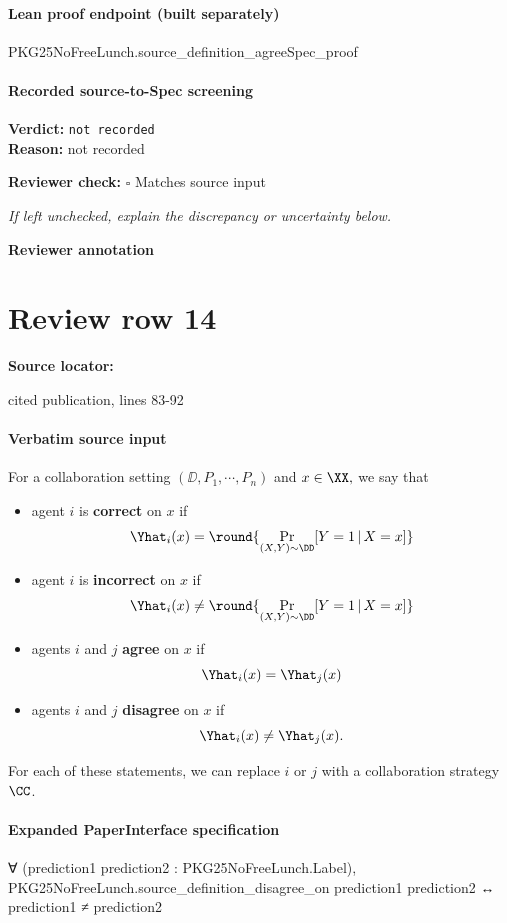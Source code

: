 \documentclass[10pt]{article}
\newcommand{\reviewerbox}{%
  \par\noindent\fbox{\parbox{0.96\linewidth}{\rule{0pt}{0.38in}}}\par
}
\newcommand{\reviewmatch}[1]{%
  \par\noindent\textbf{Reviewer check:} $\square$\; #1\par
  \noindent\emph{If left unchecked, explain the discrepancy or uncertainty below.}\par
}
\begin{document}
\paragraph{Lean proof endpoint (built separately)}\begin{ReviewVerbatim}
PKG25NoFreeLunch.source_definition_agreeSpec_proof
\end{ReviewVerbatim}

\paragraph{Recorded source-to-Spec screening}
\textbf{Verdict:} \texttt{not recorded}
\\
\textbf{Reason:} not recorded
\reviewmatch{Matches source input}
\noindent\textbf{Reviewer annotation}\par
\reviewerbox
\clearpage
\hypertarget{source-claim-b15831d5b4ce3fd5}{}
\section*{Review row 14}
\textbf{Source locator:} {\footnotesize\raggedright cited publication, lines 83-\allowbreak{}92\par}
\paragraph{Verbatim source input}
\begin{ReviewVerbatim}
\begin{definition}\label{def:correct}
For a collaboration setting $(\DD, P_1,\cdots,P_n)$ and $x\in \XX,$ we say that
\begin{itemize}
    \item agent $i$ is \textbf{correct} on $x$ if $$\Yhat_i(x) = \round{\Pr_{(X,Y)\sim \DD}[Y=1\,|\,X=x]}$$
    \item agent $i$ is \textbf{incorrect} on $x$ if $$\Yhat_i(x) \neq \round{\Pr_{(X,Y)\sim \DD}[Y=1\,|\,X=x]}$$
    \item agents $i$ and $j$ \textbf{agree} on $x$ if $$\Yhat_i(x) = \Yhat_j(x)$$
    \item agents $i$ and $j$ \textbf{disagree} on $x$ if $$\Yhat_i(x) \neq \Yhat_j(x).$$
\end{itemize}
For each of these statements, we can replace $i$ or $j$ with a collaboration strategy $\CC$.
\end{definition}
\end{ReviewVerbatim}


\paragraph{Expanded PaperInterface specification}
\begin{ReviewVerbatim}
∀ (prediction1 prediction2 : PKG25NoFreeLunch.Label),
  PKG25NoFreeLunch.source_definition_disagree_on prediction1 prediction2 ↔ prediction1 ≠ prediction2
\end{ReviewVerbatim}
\end{document}
